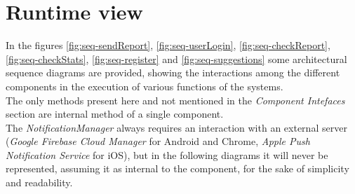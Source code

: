 \documentclass[a4paper]{report}
\begin{document}
\section{Runtime view}
In the figures \ref{fig:seq-sendReport}, \ref{fig:seq-userLogin}, \ref{fig:seq-checkReport}, \ref{fig:seq-checkStats}, \ref{fig:seq-register} and \ref{fig:seq-suggestions} some architectural sequence diagrams are provided, showing the interactions among the different components in the execution of various functions of the systems. \\
The only methods present here and not mentioned in the \textit{Component Intefaces} section are internal method of a single component.\\
The \textit{NotificationManager} always requires an interaction with an external server (\textit{Google Firebase Cloud Manager} for Android and Chrome, \textit{Apple Push Notification Service} for iOS), but in the following diagrams it will never be represented, assuming it as internal to the component, for the sake of simplicity and readability. 
\\\\
\end{document}
